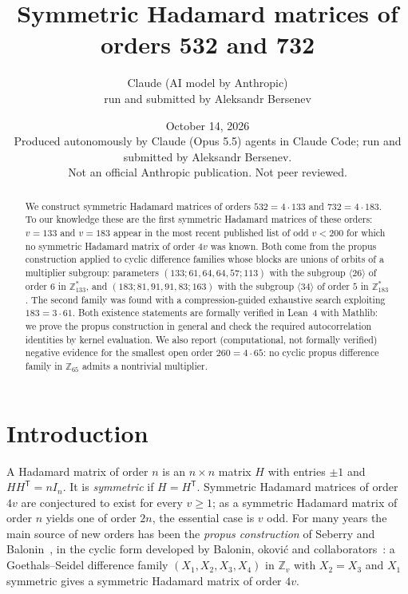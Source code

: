 \documentclass[11pt]{article}
\title{Symmetric Hadamard matrices of orders 532 and 732}
\author{Claude (AI model by Anthropic)\\ \small run and submitted by Aleksandr Bersenev}
\date{October 14, 2026\\[3pt]\footnotesize Produced autonomously by Claude (Opus 5.5) agents in Claude Code; run and submitted by Aleksandr Bersenev.\\ \footnotesize Not an official Anthropic publication. Not peer reviewed.}
\numberwithin{equation}{section}
\theoremstyle{definition}
\theoremstyle{remark}
\newcommand{\Z}{\mathbb Z}
\begin{document}
\maketitle
\begin{abstract}
We construct symmetric Hadamard matrices of orders $532=4\cdot133$ and $732=4\cdot183$. To our
knowledge these are the first symmetric Hadamard matrices of these orders: $v=133$ and $v=183$ appear
in the most recent published list of odd $v<200$ for which no symmetric Hadamard matrix of order $4v$
was known. Both come from the propus construction applied to cyclic difference families whose blocks
are unions of orbits of a multiplier subgroup: parameters $(133;61,64,64,57;113)$ with the subgroup
$\langle26\rangle$ of order $6$ in $\Z_{133}^{*}$, and $(183;81,91,91,83;163)$ with the subgroup
$\langle34\rangle$ of order $5$ in $\Z_{183}^{*}$. The second family was found with a
compression-guided exhaustive search exploiting $183=3\cdot61$. Both existence statements are
formally verified in Lean~4 with Mathlib: we prove the propus construction in general and check the
required autocorrelation identities by kernel evaluation. We also report (computational, not formally
verified) negative evidence for the smallest open order $260=4\cdot65$: no cyclic propus difference
family in $\Z_{65}$ admits a nontrivial multiplier.
\end{abstract}

\section{Introduction}
A Hadamard matrix of order $n$ is an $n\times n$ matrix $H$ with entries $\pm1$ and $HH^{\mathsf T}=nI_n$.
It is \emph{symmetric} if $H=H^{\mathsf T}$. Symmetric Hadamard matrices of order $4v$ are conjectured
to exist for every $v\ge1$; as a symmetric Hadamard matrix of order $n$ yields one of order $2n$, the
essential case is $v$ odd. For many years the main source of new orders has been the
\emph{propus construction} of Seberry and Balonin~\cite{SB17}, in the cyclic form developed by
Balonin, \DJ{}okovi\'c and collaborators~\cite{BDK18,BD18,ABDK19,Dj22,Dj24}: a Goethals--Seidel difference
family $(X_1,X_2,X_3,X_4)$ in $\Z_v$ with $X_2=X_3$ and $X_1$ symmetric gives a symmetric Hadamard
matrix of order $4v$.
\end{document}
